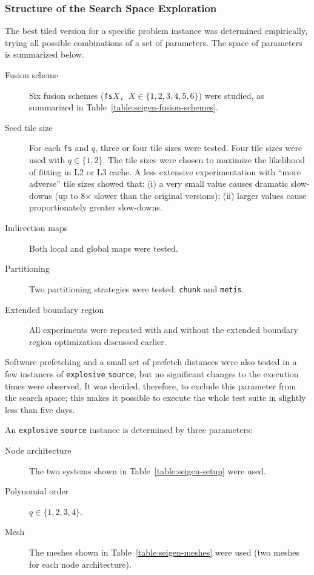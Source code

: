 

\subsubsection{Structure of the Search Space Exploration}
The best tiled version for a specific problem instance was determined empirically, trying all possible combinations of a set of parameters. The space of parameters is summarized below.

\begin{description}
\item[Fusion scheme] Six fusion schemes ({\tt fs$X$, $X \in \lbrace 1, 2, 3, 4, 5, 6\rbrace$}) were studied, as summarized in Table~\ref{table:seigen-fusion-schemes}.
\item[Seed tile size] For each {\tt fs} and $q$, three or four tile sizes were tested. Four tile sizes were used with $q \in \lbrace 1, 2\rbrace$. The tile sizes were chosen to maximize the likelihood of fitting in L2 or L3 cache. A less extensive experimentation with ``more adverse'' tile sizes showed that: (i) a very small value causes dramatic slow-downs (up to 8$\times$ slower than the original versions); (ii) larger values cause proportionately greater slow-downs.
\item[Indirection maps] Both local and global maps were tested.
\item[Partitioning] Two partitioning strategies were tested: {\tt chunk} and {\tt metis}.
\item[Extended boundary region] All experiments were repeated with and without the extended boundary region optimization discussed earlier.
\end{description}

Software prefetching and a small set of prefetch distances were also tested in a few instances of {\tt explosive$\_$source}, but no significant changes to the execution times were observed. It was decided, therefore, to exclude this parameter from the search space; this makes it possible to execute the whole test suite in slightly less than five days. 

An {\tt explosive$\_$source} instance is determined by three parameters:

\begin{description}
\item[Node architecture] The two systems shown in Table~\ref{table:seigen-setup} were used.
\item[Polynomial order] $q \in \lbrace 1, 2, 3, 4\rbrace$.
\item[Mesh] The meshes shown in Table~\ref{table:seigen-meshes} were used (two meshes for each node architecture).
\end{description}

